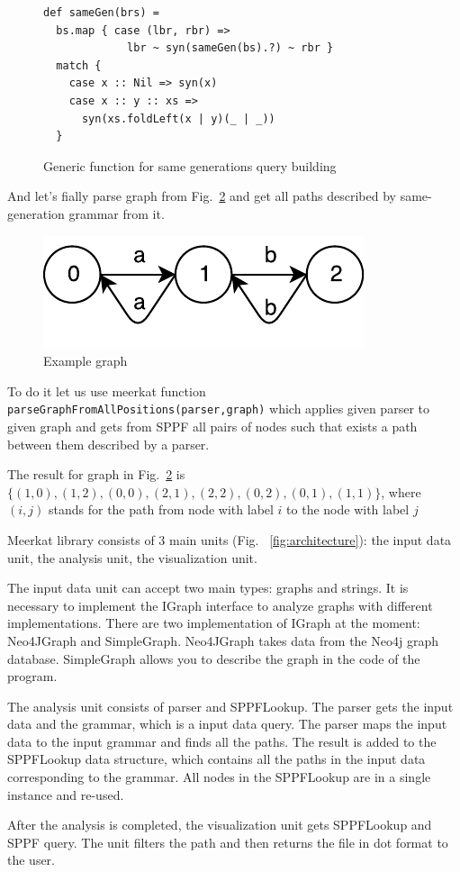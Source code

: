 \begin{figure}[h]
\begin{lstlisting}
def sameGen(brs) =
  bs.map { case (lbr, rbr) => 
             lbr ~ syn(sameGen(bs).?) ~ rbr } 
  match {
    case x :: Nil => syn(x)
    case x :: y :: xs => 
      syn(xs.foldLeft(x | y)(_ | _))
  }
\end{lstlisting}
\caption{Generic function for same generations query building}
\label{fig:gen}
\end{figure}

And let's fially parse graph from Fig.~\ref{fig:graph} and get all paths described by same-generation grammar from it.

\begin{figure}[h]
\includegraphics{graph}
\caption{Example graph}
\label{fig:graph}
\end{figure}

To do it let us use meerkat function \lstinline{parseGraphFromAllPositions(parser,graph)} which applies given parser to given graph and gets from SPPF all pairs of nodes such that exists a path between them described by a parser.

The result for graph in Fig.~\ref{fig:graph} is $\{(1,0), (1,2), (0,0), (2,1), (2,2), (0,2), (0,1), (1,1)\}$, where $(i,j)$ stands for the path from node with label $i$ to the node with label $j$

Meerkat library consists of 3 main units (Fig. ~\ref{fig:architecture}): the input data unit, the analysis unit, the visualization unit.

The input data unit can accept two main types: graphs and strings. It is necessary to implement the IGraph interface to analyze graphs with different implementations. There are two implementation of IGraph at the moment: Neo4JGraph and SimpleGraph. Neo4JGraph takes data from the Neo4j graph database. SimpleGraph allows you to describe the graph in the code of the program.

The analysis unit consists of parser and SPPFLookup. The parser gets the input data and the grammar, which is a input data query.  The parser maps the input data to the input grammar and finds all the paths. The result is added to the SPPFLookup data structure, which contains all the paths in the input data corresponding to the grammar. All nodes in the SPPFLookup are in a single instance and re-used.

After the analysis is completed, the visualization unit gets SPPFLookup and SPPF query. The unit filters the path and then returns the file in dot format to the user.




